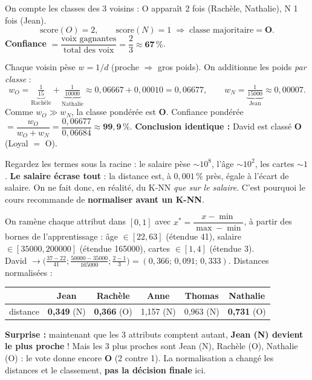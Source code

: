 \begin{Calcul}
On compte les classes des 3 voisins : \og O \fg{} apparaît 2 fois (Rachèle, Nathalie),
\og N \fg{} 1 fois (Jean).
\[ \text{score}(O)=2,\qquad \text{score}(N)=1 \;\Rightarrow\; \text{classe majoritaire}=\mathbf{O}. \]
\textbf{Confiance} $=\dfrac{\text{voix gagnantes}}{\text{total des voix}}=\dfrac{2}{3}\approx \mathbf{67\,\%}$.
\end{Calcul}

\begin{Calcul}
Chaque voisin pèse $w=1/d$ (proche $\Rightarrow$ gros poids). On additionne les poids
\emph{par classe} :
\[ w_O=\underbrace{\tfrac{1}{15}}_{\text{Rachèle}}+\underbrace{\tfrac{1}{10000}}_{\text{Nathalie}}
   \approx 0{,}06667+0{,}00010=0{,}06677, \qquad
   w_N=\underbrace{\tfrac{1}{15000}}_{\text{Jean}}\approx 0{,}00007. \]
Comme $w_O \gg w_N$, la classe pondérée est \textbf{O}.
Confiance pondérée $=\dfrac{w_O}{w_O+w_N}=\dfrac{0{,}06677}{0{,}06684}\approx \mathbf{99{,}9\,\%}$.
\textbf{Conclusion identique :} David est classé \textbf{O} (Loyal $=$ O).
\end{Calcul}

\begin{Attention}
Regardez les termes sous la racine : le salaire pèse $\sim 10^8$, l'âge $\sim 10^2$, les
cartes $\sim 1$. \textbf{Le salaire écrase tout} : la distance est, à $0{,}001\,\%$ près, égale
à l'écart de salaire. On ne fait donc, en réalité, du K-NN \emph{que sur le salaire}. C'est
pourquoi le cours recommande de \textbf{normaliser avant un K-NN}.
\end{Attention}

\begin{Calcul}
On ramène chaque attribut dans $[0,1]$ avec $x^*=\dfrac{x-\min}{\max-\min}$, à partir des
bornes de l'apprentissage : âge $\in[22,63]$ (étendue 41), salaire $\in[35000,200000]$
(étendue 165000), cartes $\in[1,4]$ (étendue 3).\\[3pt]
David $\rightarrow \big(\tfrac{37-22}{41};\tfrac{50000-35000}{165000};\tfrac{2-1}{3}\big)
=(0{,}366;\,0{,}091;\,0{,}333)$. Distances normalisées :
\begin{center}\small
\begin{tabular}{lccccc}
\toprule
& Jean & Rachèle & Anne & Thomas & Nathalie\\
\midrule
distance & \textbf{0,349} (N) & \textbf{0,366} (O) & 1,157 (N) & 0,963 (N) & \textbf{0,731} (O)\\
\bottomrule
\end{tabular}
\end{center}
\textbf{Surprise :} maintenant que les 3 attributs comptent autant, \textbf{Jean (N) devient le
plus proche} ! Mais les 3 plus proches sont Jean (N), Rachèle (O), Nathalie (O) : le vote
donne encore $\mathbf{O}$ (2 contre 1). La normalisation a changé les distances et le
classement, \textbf{pas la décision finale} ici.
\end{Calcul}

